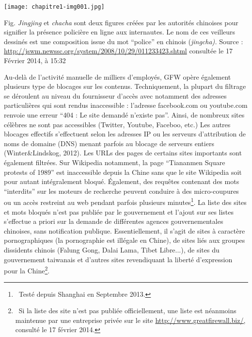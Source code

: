 \bigskip

{\centering \par}
\begin{center}
\texttt{[image: chapitre1-img001.jpg]}
\end{center}
{\color{black}
Fig. \textit{Jingjing }et \textit{chacha }sont deux figures cr\'e\'ees par les autorit\'es chinoises pour signifier la
pr\'esence polici\`ere en ligne aux internautes. Le nom de ces veilleurs dessin\'es est une composition issue du mot
``police'' en chinois (\textit{jingcha). }Source : \url{http://jswm.newssc.org/system/2008/10/29/011233423.shtml}
consult\'ee le 17 F\'evrier 2014, \`a 15:32}


\bigskip

{\color{black}
Au-del\`a de l'activit\'e manuelle de milliers d'employ\'es, GFW op\`ere \'egalement plusieurs type de blocages sur les
contenus. Techniquement, la plupart du filtrage se d\'eroulent au niveau du fournisseur d'acc\`es avec notamment des
adresses particuli\`eres qui sont rendus inaccessible : l'adresse facebook.com ou youtube.com renvoie une erreur ``404
: Le site demand\'e n'existe pas''. Ainsi, de nombreux sites c\'el\`ebres ne sont pas accessibles (Twitter, Youtube,
Faceboo, etc.) Les autres blocages effectifs s'effectuent selon les adresses IP ou les serveurs d'attribution de noms
de domaine (DNS) menant parfois au blocage de serveurs entiers (Winter\&Lindskog, 2012). Les URLs des pages de certains
sites importants sont \'egalement filtr\'ees. Sur Wikipedia notamment, la page ``Tiananmen Square protests of 1989''
est inaccessible depuis la Chine sans que le site Wikipedia soit pour autant int\'egralement bloqu\'e. \'Egalement, des
requ\^etes contenant des mots ``interdits'' sur les moteurs de recherche peuvent conduire \`a des micro-coupures ou un
acc\`es restreint au web pendant parfois plusieurs minutes\footnote{\ Test\'e depuis Shanghai en Septembre 2013.}. La
liste des sites et mots bloqu\'es n'est pas publi\'ee par le gouvernement et l'ajout sur ses listes s'effectue a priori
sur la demande de diff\'erentes agences gouvernementales chinoises, sans notification publique. Essentiellement, il
s'agit de sites \`a caract\`ere pornographiques (la pornographie est ill\'egale en Chine), de sites li\'es aux groupes
dissidents chinois (Falung Gong, Dalai Lama, Tibet Libre...), de sites du gouvernement taiwanais et d'autres sites
revendiquant la libert\'e d'expression pour la Chine\footnote{\ Si la liste des site n'est pas publi\'ee
officiellement, une liste est n\'eanmoins maintenue par une entreprise priv\'ee sur le site
\url{http://www.greatfirewall.biz/,} consult\'e le 17 f\'evrier 2014.}.}


